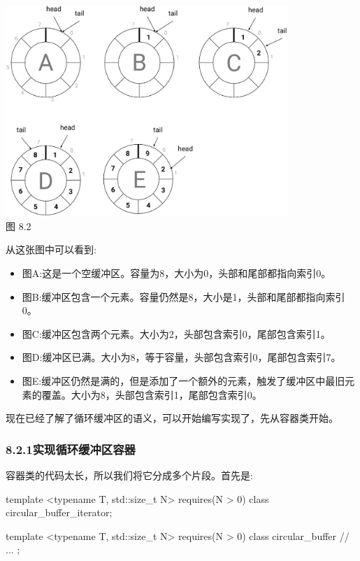 \begin{center}
\includegraphics[width=0.8\textwidth]{images/2.png}\\
图 8.2
\end{center}

从这张图中可以看到:

\begin{itemize}
\item
图A:这是一个空缓冲区。容量为8，大小为0，头部和尾部都指向索引0。

\item
图B:缓冲区包含一个元素。容量仍然是8，大小是1，头部和尾部都指向索引0。

\item
图C:缓冲区包含两个元素。大小为2，头部包含索引0，尾部包含索引1。

\item
图D:缓冲区已满。大小为8，等于容量，头部包含索引0，尾部包含索引7。

\item
图E:缓冲区仍然是满的，但是添加了一个额外的元素，触发了缓冲区中最旧元素的覆盖。大小为8，头部包含索引1，尾部包含索引0。
\end{itemize}

现在已经了解了循环缓冲区的语义，可以开始编写实现了，先从容器类开始。

\subsubsection{8.2.1\hspace{0.2cm}实现循环缓冲区容器}

容器类的代码太长，所以我们将它分成多个片段。首先是:

\begin{cpp}
template <typename T, std::size_t N>
	requires(N > 0)
class circular_buffer_iterator;

template <typename T, std::size_t N>
	requires(N > 0)
class circular_buffer
{
	// ...
};
\end{cpp}

